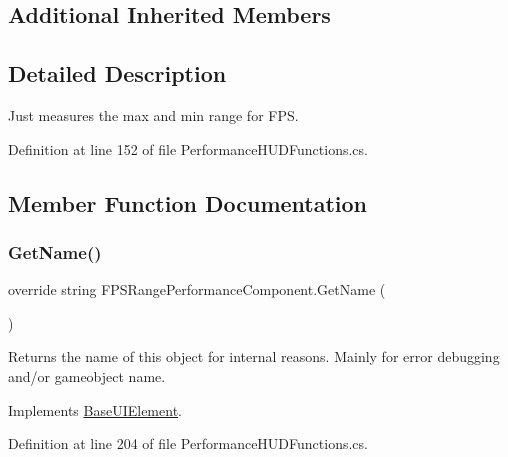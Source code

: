 \subsection*{Additional Inherited Members}


\subsection{Detailed Description}
Just measures the max and min range for F\+PS. 



Definition at line 152 of file Performance\+H\+U\+D\+Functions.\+cs.



\subsection{Member Function Documentation}
\mbox{\label{class_f_p_s_range_performance_component_a67b39af33ece4ca186a9bdc92baf5220}} 
\subsubsection{\texorpdfstring{Get\+Name()}{GetName()}}
{\footnotesize\ttfamily override string F\+P\+S\+Range\+Performance\+Component.\+Get\+Name (\begin{DoxyParamCaption}{ }\end{DoxyParamCaption})\hspace{0.3cm}{\ttfamily [virtual]}}



Returns the name of this object for internal reasons. Mainly for error debugging and/or gameobject name. 



Implements \hyperlink{class_base_u_i_element_acb7fcd49138477941f2e43733ad9d34d}{Base\+U\+I\+Element}.



Definition at line 204 of file Performance\+H\+U\+D\+Functions.\+cs.

\mbox{\label{class_f_p_s_range_performance_component_ab0f8d2e573a831035521296503b274fc}} 
